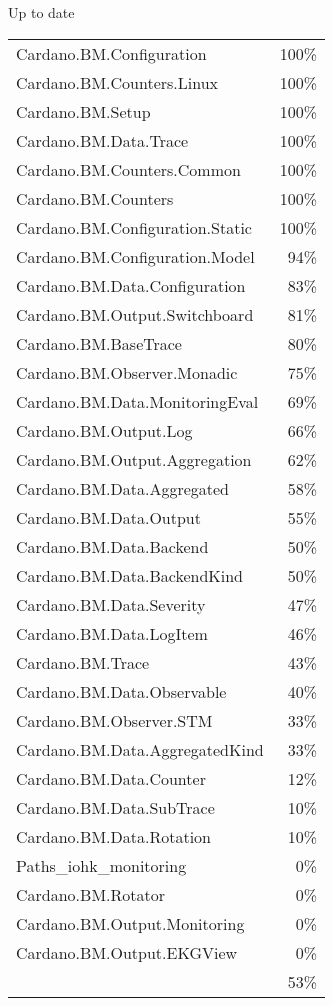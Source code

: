 Up to date
\begin{tabular}{l r}
   Cardano.BM.Configuration & 100\% \\
   Cardano.BM.Counters.Linux & 100\% \\
   Cardano.BM.Setup & 100\% \\
   Cardano.BM.Data.Trace & 100\% \\
   Cardano.BM.Counters.Common & 100\% \\
   Cardano.BM.Counters & 100\% \\
   Cardano.BM.Configuration.Static & 100\% \\
   Cardano.BM.Configuration.Model & 94\% \\
   Cardano.BM.Data.Configuration & 83\% \\
   Cardano.BM.Output.Switchboard & 81\% \\
   Cardano.BM.BaseTrace & 80\% \\
   Cardano.BM.Observer.Monadic & 75\% \\
   Cardano.BM.Data.MonitoringEval & 69\% \\
   Cardano.BM.Output.Log & 66\% \\
   Cardano.BM.Output.Aggregation & 62\% \\
   Cardano.BM.Data.Aggregated & 58\% \\
   Cardano.BM.Data.Output & 55\% \\
   Cardano.BM.Data.Backend & 50\% \\
   Cardano.BM.Data.BackendKind & 50\% \\
   Cardano.BM.Data.Severity & 47\% \\
   Cardano.BM.Data.LogItem & 46\% \\
   Cardano.BM.Trace & 43\% \\
   Cardano.BM.Data.Observable & 40\% \\
   Cardano.BM.Observer.STM & 33\% \\
   Cardano.BM.Data.AggregatedKind & 33\% \\
   Cardano.BM.Data.Counter & 12\% \\
   Cardano.BM.Data.SubTrace & 10\% \\
   Cardano.BM.Data.Rotation & 10\% \\
   Paths\_iohk\_monitoring & 0\% \\
   Cardano.BM.Rotator & 0\% \\
   Cardano.BM.Output.Monitoring & 0\% \\
   Cardano.BM.Output.EKGView & 0\% \\
    & 53\% \\
\end{tabular}
